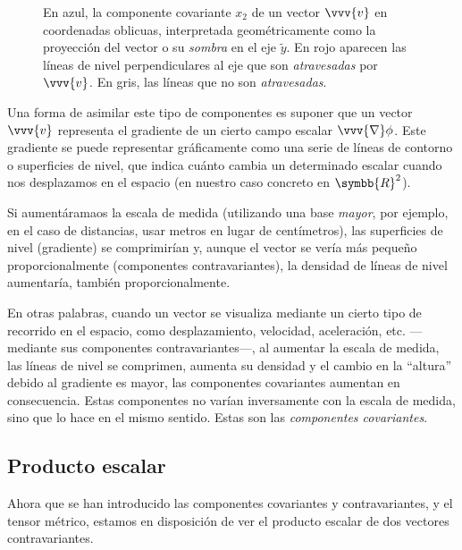 \begin{figure}[ht]
\begin{minipage}{0.45\linewidth}
    \caption{En azul, la componente covariante $x_2$ de un vector $\vvv{v}$ en
      coordenadas oblicuas, interpretada geométricamente como la proyección del vector o
      su \emph{sombra} en el eje $\tilde{y}$. En rojo aparecen las líneas de nivel
      perpendiculares al eje que son \emph{atravesadas} por $\vvv{v}$.
      En gris, las líneas que no son \emph{atravesadas}.}
    \label{fig:R2-oblic_cov2}
  \end{minipage}
\end{figure}

Una forma de asimilar este tipo de componentes es suponer que un vector $\vvv{v}$
representa el gradiente de un cierto campo escalar $\vvv{\nabla}\phi$.
Este gradiente se puede representar gráficamente como una serie de líneas de contorno o
superficies de nivel, que indica cuánto cambia un determinado escalar cuando nos
desplazamos en el espacio (en nuestro caso concreto en $\symbb{R}^2$).

Si aumentáramaos la escala de medida (utilizando una base \emph{mayor}, por ejemplo, en
el caso de distancias, usar metros en lugar de centímetros), las superficies de nivel
(gradiente) se comprimirían y, aunque el vector se vería más pequeño proporcionalmente
(componentes contravariantes), la densidad de líneas de nivel aumentaría, también
proporcionalmente.

En otras palabras, cuando un vector se visualiza mediante un cierto tipo de
recorrido en el espacio, como desplazamiento, velocidad, aceleración, etc.
---mediante sus componentes contravariantes---, al aumentar la escala de medida, las
líneas de nivel se comprimen, aumenta su densidad y el cambio en la ``altura'' debido al
gradiente es mayor, las componentes covariantes aumentan en consecuencia. Estas
componentes no varían inversamente con la escala de medida, sino que lo hace en el mismo
sentido. Estas son las \emph{componentes covariantes}.


\subsection{Producto escalar}
Ahora que se han introducido las componentes covariantes y contravariantes, y el tensor
métrico, estamos en disposición de ver el producto escalar de dos vectores
contravariantes.

